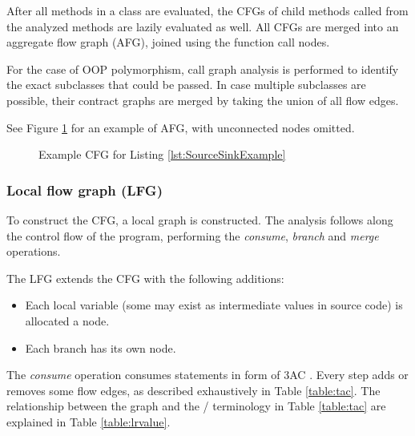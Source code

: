 After all methods in a class are evaluated,
the CFGs of child methods called from the analyzed methods
are lazily evaluated as well.
All CFGs are merged into an aggregate flow graph (AFG),
joined using the function call nodes.

For the case of OOP polymorphism,
call graph analysis is performed to identify
the exact subclasses that could be passed.
In case multiple subclasses are possible,
their contract graphs are merged by taking the union of all flow edges.

See Figure \ref{fig:SourceSinkContract} for an example of AFG,
with unconnected nodes omitted.

\begin{figure}
	\caption{Example CFG for Listing \ref{lst:SourceSinkExample}}
	\begin{center}
	\end{center}
	\label{fig:SourceSinkContract}
\end{figure}

\subsubsection{Local flow graph (LFG)}
To construct the CFG,
a local graph is constructed.
The analysis follows along the control flow of the program,
performing the \emph{consume}, \emph{branch} and \emph{merge} operations.

The LFG extends the CFG with the following additions:
\begin{itemize}
	\item Each local variable (some may exist as intermediate values in source code)
		is allocated a node.
	\item Each branch has its own  node.
\end{itemize}

The \emph{consume} operation consumes statements in form of 3AC \cite{sootsurvivor}.
Every step adds or removes some flow edges,
as described exhaustively in Table \ref{table:tac}.
The relationship between the graph and the / terminology
in Table \ref{table:tac} are explained in Table \ref{table:lrvalue}.

